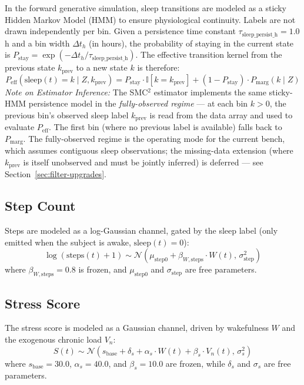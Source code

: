 \documentclass[11pt,a4paper]{article}
\begin{document}
In the forward generative simulation, sleep transitions are modeled as a sticky Hidden Markov Model (HMM) to ensure physiological continuity. Labels are not drawn independently per bin. Given a persistence time constant $\tau_{\text{sleep\_persist\_h}} = 1.0$\,h and a bin width $\Delta t_h$ (in hours), the probability of staying in the current state is $P_{\text{stay}} = \exp(-\Delta t_h / \tau_{\text{sleep\_persist\_h}})$. The effective transition kernel from the previous state $k_{\text{prev}}$ to a new state $k$ is therefore:
\[
P_{\text{eff}}(\text{sleep}(t) = k \mid Z, k_{\text{prev}}) = P_{\text{stay}} \cdot \mathbb{I}[k = k_{\text{prev}}] + (1 - P_{\text{stay}}) \cdot P_{\text{marg}}(k \mid Z)
\]
\textit{Note on Estimator Inference:} The SMC$^2$ estimator implements the same sticky-HMM persistence model in the \textit{fully-observed regime} — at each bin $k > 0$, the previous bin's observed sleep label $k_{\text{prev}}$ is read from the data array and used to evaluate $P_{\text{eff}}$. The first bin (where no previous label is available) falls back to $P_{\text{marg}}$. The fully-observed regime is the operating mode for the current bench, which assumes contiguous sleep observations; the missing-data extension (where $k_{\text{prev}}$ is itself unobserved and must be jointly inferred) is deferred — see Section~\ref{sec:filter-upgrades}.

\subsection{Step Count}
Steps are modeled as a log-Gaussian channel, gated by the sleep label (only emitted when the subject is awake, $\text{sleep}(t) = 0$):
\[
\log(\text{steps}(t) + 1) \sim \mathcal{N}\left(\mu_{\text{step}0} + \beta_{W,\text{steps}} \cdot W(t), \, \sigma_{\text{step}}^2\right)
\]
where $\beta_{W,\text{steps}} = 0.8$ is frozen, and $\mu_{\text{step}0}$ and $\sigma_{\text{step}}$ are free parameters.

\subsection{Stress Score}
The stress score is modeled as a Gaussian channel, driven by wakefulness $W$ and the exogenous chronic load $V_n$:
\[
S(t) \sim \mathcal{N}\left(s_{\text{base}} + \delta_s + \alpha_s \cdot W(t) + \beta_s \cdot V_n(t), \, \sigma_s^2\right)
\]
where $s_{\text{base}} = 30.0$, $\alpha_s = 40.0$, and $\beta_s = 10.0$ are frozen, while $\delta_s$ and $\sigma_s$ are free parameters.
\end{document}
